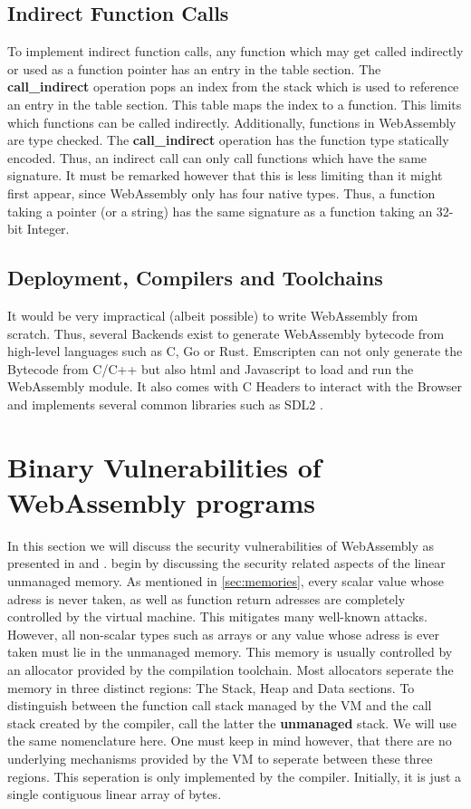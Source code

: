 \documentclass[sigconf]{acmart}
\begin{document}
\subsection{Indirect Function Calls} 
\label{sec:indirect_calls}
To implement indirect function calls, any function which may get called indirectly or used as a function pointer has an entry in the table section. The \textbf{call\_indirect}  operation pops an index from the stack which is used to reference an entry in the table section. This table maps the index to a function. This limits which functions can be called indirectly. Additionally, functions in WebAssembly are type checked. The \textbf{call\_indirect} operation has the function type statically encoded. Thus, an indirect call can only call functions which have the same signature. It must be remarked however that this is less limiting than it might first appear, since WebAssembly only has four native types. Thus, a function taking a pointer (or a string) has the same signature as a function taking an 32-bit Integer.

\subsection{Deployment, Compilers and Toolchains}
It would be very impractical (albeit possible) to write WebAssembly from scratch. Thus, several Backends exist to generate WebAssembly bytecode from high-level languages such as C, Go or Rust. Emscripten \cite{emscripten} can not only generate the Bytecode from C/C++ but also html and Javascript to load and run the WebAssembly module. It also comes with C Headers to interact with the Browser and implements several common libraries such as SDL2 \cite{sdl2}.  

\section{Binary Vulnerabilities of WebAssembly programs}
In this section we will discuss the security vulnerabilities of WebAssembly as presented in \cite{mcfadden_security_2018} and \cite{lehmann_everything_2020}. \cite{lehmann_everything_2020} begin by discussing the security related aspects of the linear unmanaged memory. As mentioned in \ref{sec:memories}, every scalar value whose adress is never taken, as well as function return adresses are completely controlled by the virtual machine. This mitigates many well-known attacks. However, all non-scalar types such as arrays or any value whose adress is ever taken must lie in the unmanaged memory. This memory is usually controlled by an allocator provided by the compilation toolchain. Most allocators seperate the memory in three distinct regions: The Stack, Heap and Data sections. To distinguish between the function call stack managed by the VM and the call stack created by the compiler, \cite{lehmann_everything_2020} call the latter the \textbf{unmanaged} stack. We will use the same nomenclature here. One must keep in mind however, that there are no underlying mechanisms provided by the VM to seperate between these three regions. This seperation is only implemented by the compiler. Initially, it is just a single contiguous linear array of bytes. 
\end{document}
